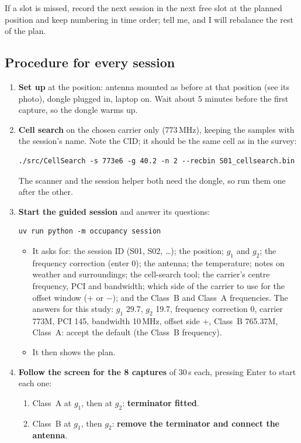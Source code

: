 \documentclass[11pt,a4paper]{article}
\begin{document}
If a slot is missed, record the next session in the next free slot at the planned position and keep numbering in time order; tell me, and I will rebalance the rest of the plan.

\subsection*{Procedure for every session}
\begin{enumerate}
\item \textbf{Set up} at the position: antenna mounted as before at that position (see its photo), dongle plugged in, laptop on. Wait about 5 minutes before the first capture, so the dongle warms up.
\item \textbf{Cell search} on the chosen carrier only (773\,MHz), keeping the samples with the session's name. Note the CID; it should be the same cell as in the survey:
\begin{Verbatim}
./src/CellSearch -s 773e6 -g 40.2 -n 2 --recbin S01_cellsearch.bin
\end{Verbatim}
The scanner and the session helper both need the dongle, so run them one after the other.
\item \textbf{Start the guided session} and answer its questions:
\begin{Verbatim}
uv run python -m occupancy session
\end{Verbatim}
\begin{itemize}
\item It asks for: the session ID (S01, S02, \dots); the position; $g_1$ and $g_2$; the frequency correction (enter 0); the antenna; the temperature; notes on weather and surroundings; the cell-search tool; the carrier's centre frequency, PCI and bandwidth; which side of the carrier to use for the offset window (+ or $-$); and the Class~B and Class~A frequencies. The answers for this study: $g_1$ 29.7, $g_2$ 19.7, frequency correction 0, carrier 773M, PCI 145, bandwidth 10\,MHz, offset side +, Class~B 765.37M, Class~A: accept the default (the Class~B frequency).
\item It then shows the plan.
\end{itemize}
\item \textbf{Follow the screen for the 8 captures} of 30\,s each, pressing Enter to start each one:
  \begin{enumerate}[label=\alph*.]
  \item Class~A at $g_1$, then at $g_2$: \textbf{terminator fitted}.
  \item Class~B at $g_1$, then $g_2$: \textbf{remove the terminator and connect the antenna}.

\end{enumerate}
\end{enumerate}
\end{document}

